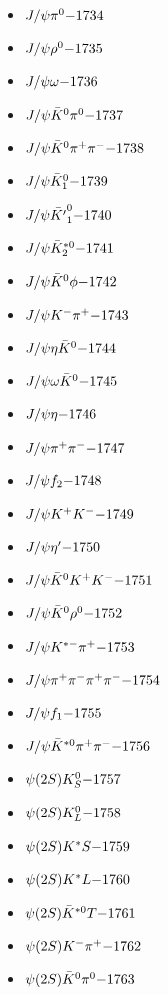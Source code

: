 \begin{multicols}{3}
\begin{itemize}
 \item $ J/\psi \pi^{0} \hfill{-1734}$
 \item $ J/\psi \rho^{0} \hfill{-1735}$
 \item $ J/\psi \omega \hfill{-1736}$
 \item $ J/\psi \bar{K}^{0} \pi^{0} \hfill{-1737}$
 \item $ J/\psi \bar{K}^{0} \pi^{+} \pi^{-} \hfill{-1738}$
 \item $ J/\psi \bar{K}_{1}^{0} \hfill{-1739}$
 \item $ J/\psi \bar{{K^{\prime}}}_{1}^{0} \hfill{-1740}$
 \item $ J/\psi \bar{K}_{2}^{*0} \hfill{-1741}$
 \item $ J/\psi \bar{K}^{0} \phi \hfill{-1742}$
 \item $ J/\psi K^{-} \pi^{+} \hfill{-1743}$
 \item $ J/\psi \eta \bar{K}^{0} \hfill{-1744}$
 \item $ J/\psi \omega \bar{K}^{0} \hfill{-1745}$
 \item $ J/\psi \eta \hfill{-1746}$
 \item $ J/\psi \pi^{+} \pi^{-} \hfill{-1747}$
 \item $ J/\psi f_{2} \hfill{-1748}$
 \item $ J/\psi K^{+} K^{-} \hfill{-1749}$
 \item $ J/\psi {\eta^{\prime}} \hfill{-1750}$
 \item $ J/\psi \bar{K}^{0} K^{+} K^{-} \hfill{-1751}$
 \item $ J/\psi \bar{K}^{0} \rho^{0} \hfill{-1752}$
 \item $ J/\psi K^{*-} \pi^{+} \hfill{-1753}$
 \item $ J/\psi \pi^{+} \pi^{-} \pi^{+} \pi^{-} \hfill{-1754}$
 \item $ J/\psi f_{1} \hfill{-1755}$
 \item $ J/\psi \bar{K}^{*0} \pi^{+} \pi^{-} \hfill{-1756}$
 \item $ \psi(2S) K_{S}^{0} \hfill{-1757}$
 \item $ \psi(2S) K_{L}^{0} \hfill{-1758}$
 \item $ \psi(2S) K^{*}S \hfill{-1759}$
 \item $ \psi(2S) K^{*}L \hfill{-1760}$
 \item $ \psi(2S) \bar{K}^{*0}T \hfill{-1761}$
 \item $ \psi(2S) K^{-} \pi^{+} \hfill{-1762}$
 \item $ \psi(2S) \bar{K}^{0} \pi^{0} \hfill{-1763}$

\end{itemize}
\end{multicols}
